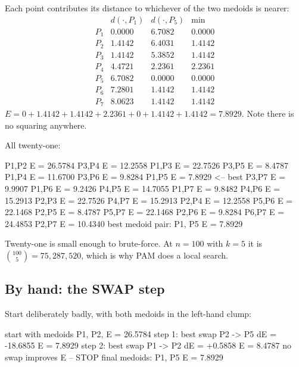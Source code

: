 \documentclass[11pt]{article}
\begin{document}
\begin{worked}
Each point contributes its distance to whichever of the two medoids is
nearer:
\[
\begin{array}{lccc}
  & d(\cdot, P_1) & d(\cdot, P_5) & \min\\[2pt]
  P_1 & 0.0000 & 6.7082 & 0.0000\\
  P_2 & 1.4142 & 6.4031 & 1.4142\\
  P_3 & 1.4142 & 5.3852 & 1.4142\\
  P_4 & 4.4721 & 2.2361 & 2.2361\\
  P_5 & 6.7082 & 0.0000 & 0.0000\\
  P_6 & 7.2801 & 1.4142 & 1.4142\\
  P_7 & 8.0623 & 1.4142 & 1.4142
\end{array}
\]
$E = 0 + 1.4142 + 1.4142 + 2.2361 + 0 + 1.4142 + 1.4142 = \mathbf{7.8929}$.
Note there is no squaring anywhere.
\end{worked}

All twenty-one:

\begin{codeout}
  {P1,P2}  E =  26.5784      {P3,P4}  E =  12.2558
  {P1,P3}  E =  22.7526      {P3,P5}  E =   8.4787
  {P1,P4}  E =  11.6700      {P3,P6}  E =   9.8284
  {P1,P5}  E =   7.8929  <-- best     {P3,P7}  E =   9.9907
  {P1,P6}  E =   9.2426      {P4,P5}  E =  14.7055
  {P1,P7}  E =   9.8482      {P4,P6}  E =  15.2913
  {P2,P3}  E =  22.7526      {P4,P7}  E =  15.2913
  {P2,P4}  E =  12.2558      {P5,P6}  E =  22.1468
  {P2,P5}  E =   8.4787      {P5,P7}  E =  22.1468
  {P2,P6}  E =   9.8284      {P6,P7}  E =  24.4853
  {P2,P7}  E =  10.4340
  best medoid pair: {P1, P5}   E = 7.8929
\end{codeout}

Twenty-one is small enough to brute-force. At $n = 100$ with $k = 5$ it is
$\binom{100}{5} = 75{,}287{,}520$, which is why PAM does a local search.

\subsection{By hand: the SWAP step}

Start deliberately badly, with both medoids in the left-hand clump:

\begin{codeout}
  start with medoids {P1, P2}, E = 26.5784
  step 1: best swap  P2 -> P5   dE = -18.6855   E =  7.8929
  step 2: best swap  P1 -> P2   dE =  +0.5858   E =  8.4787
          no swap improves E -- STOP
  final medoids: {P1, P5}   E = 7.8929
\end{codeout}
\end{document}
